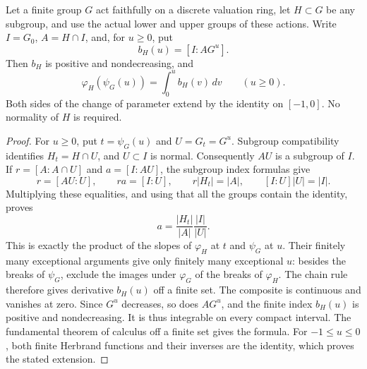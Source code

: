 \begin{lemma}
\label{fw:herbrand-subgroup-integral}
\leanok
Let a finite group $G$ act faithfully on a discrete valuation ring, let
$H\subset G$ be any subgroup, and use the actual lower and upper groups
of these actions. Write $I=G_0$, $A=H\cap I$, and, for $u\geq0$, put
\[
 b_H(u)=[I:A G^u].
\]
Then $b_H$ is positive and nondecreasing, and
\[
 \varphi_H(\psi_G(u))=\int_0^u b_H(v)\,dv\qquad(u\geq0).
\]
Both sides of the change of parameter extend by the identity on
$[-1,0]$. No normality of $H$ is required.
\end{lemma}
\begin{proof}
For $u\geq0$, put $t=\psi_G(u)$ and $U=G_t=G^u$. Subgroup
compatibility identifies $H_t=H\cap U$, and $U\subset I$ is normal.
Consequently $AU$ is a subgroup of $I$. If $r=[A:A\cap U]$ and
$a=[I:AU]$, the subgroup index formulas give
\[
 r=[AU:U],\qquad ra=[I:U],\qquad
 r|H_t|=|A|,\qquad [I:U]|U|=|I|.
\]
Multiplying these equalities, and using that all the groups contain the
identity, proves
\[
 a=\frac{|H_t|}{|A|}\frac{|I|}{|U|}.
\]
This is exactly the product of the slopes of $\varphi_H$ at $t$ and
$\psi_G$ at $u$. Their finitely many exceptional arguments give only
finitely many exceptional $u$: besides the breaks of $\psi_G$, exclude
the images under $\varphi_G$ of the breaks of $\varphi_H$. The chain
rule therefore gives derivative $b_H(u)$ off a finite set. The composite
is continuous and vanishes at zero. Since $G^u$ decreases, so does
$AG^u$, and the finite index $b_H(u)$ is positive and nondecreasing.
It is thus integrable on every compact interval. The fundamental theorem
of calculus off a finite set gives the formula. For $-1\leq u\leq0$,
both finite Herbrand functions and their inverses are the identity,
which proves the stated extension.
\end{proof}
